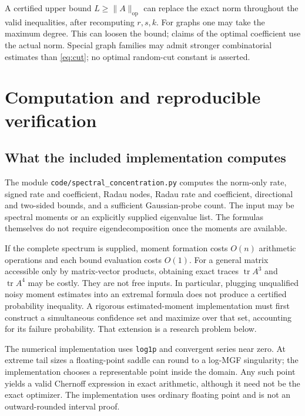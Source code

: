 \documentclass[11pt,letterpaper]{article}
\numberwithin{equation}{section}
\theoremstyle{definition}\newtheorem{definition}[theorem]{Definition}
\theoremstyle{remark}\newtheorem{remark}[theorem]{Remark}
\newcommand{\tr}{\operatorname{tr}}
\newcommand{\op}{\mathrm{op}}
\begin{document}
A certified upper bound $L\ge\|A\|_{\op}$ can replace the exact
norm throughout the valid inequalities, after recomputing $r,s,k$.
For graphs one may take the maximum degree. This can loosen the
bound; claims of the optimal coefficient use the actual norm.
Special graph families may admit stronger combinatorial estimates
than \eqref{eq:cut}; no optimal random-cut constant is asserted.

\section{Computation and reproducible verification}\label{sec:verification}

\subsection{What the included implementation computes}
The module \texttt{code/spectral\_concentration.py} computes the
norm-only rate, signed rate and coefficient, Radau nodes, Radau
rate and coefficient, directional and two-sided bounds, and a
sufficient Gaussian-probe count. The input may be spectral moments
or an explicitly supplied eigenvalue list. The formulas themselves
do not require eigendecomposition once the moments are available.

If the complete spectrum is supplied, moment formation costs
$O(n)$ arithmetic operations and each bound evaluation costs $O(1)$.
For a general matrix accessible only by matrix-vector products,
obtaining exact traces $\tr A^3$ and $\tr A^4$ may be costly.
They are not free inputs. In particular, plugging unqualified noisy
moment estimates into an extremal formula does not produce a
certified probability inequality. A rigorous estimated-moment
implementation must first construct a simultaneous confidence set
and maximize over that set, accounting for its failure probability.
That extension is a research problem below.

The numerical implementation uses \texttt{log1p} and convergent
series near zero. At extreme tail sizes a floating-point saddle can
round to a log-MGF singularity; the implementation chooses a
representable point inside the domain. Any such point yields a
valid Chernoff expression in exact arithmetic, although it need not
be the exact optimizer. The implementation uses ordinary floating
point and is not an outward-rounded interval proof.
\end{document}
